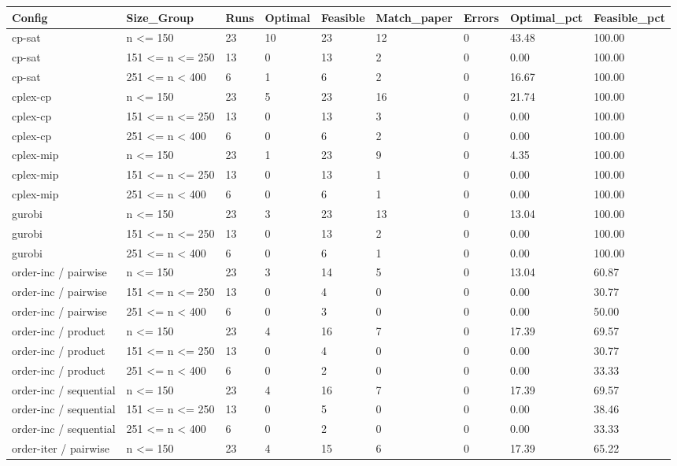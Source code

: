 \begin{tabular}{lllllllll}
\hline
Config & Size\_Group & Runs & Optimal & Feasible & Match\_paper & Errors & Optimal\_pct & Feasible\_pct \\
\hline
cp-sat & n <= 150 & 23 & 10 & 23 & 12 & 0 & 43.48 & 100.00 \\
cp-sat & 151 <= n <= 250 & 13 & 0 & 13 & 2 & 0 & 0.00 & 100.00 \\
cp-sat & 251 <= n < 400 & 6 & 1 & 6 & 2 & 0 & 16.67 & 100.00 \\
cplex-cp & n <= 150 & 23 & 5 & 23 & 16 & 0 & 21.74 & 100.00 \\
cplex-cp & 151 <= n <= 250 & 13 & 0 & 13 & 3 & 0 & 0.00 & 100.00 \\
cplex-cp & 251 <= n < 400 & 6 & 0 & 6 & 2 & 0 & 0.00 & 100.00 \\
cplex-mip & n <= 150 & 23 & 1 & 23 & 9 & 0 & 4.35 & 100.00 \\
cplex-mip & 151 <= n <= 250 & 13 & 0 & 13 & 1 & 0 & 0.00 & 100.00 \\
cplex-mip & 251 <= n < 400 & 6 & 0 & 6 & 1 & 0 & 0.00 & 100.00 \\
gurobi & n <= 150 & 23 & 3 & 23 & 13 & 0 & 13.04 & 100.00 \\
gurobi & 151 <= n <= 250 & 13 & 0 & 13 & 2 & 0 & 0.00 & 100.00 \\
gurobi & 251 <= n < 400 & 6 & 0 & 6 & 1 & 0 & 0.00 & 100.00 \\
order-inc / pairwise & n <= 150 & 23 & 3 & 14 & 5 & 0 & 13.04 & 60.87 \\
order-inc / pairwise & 151 <= n <= 250 & 13 & 0 & 4 & 0 & 0 & 0.00 & 30.77 \\
order-inc / pairwise & 251 <= n < 400 & 6 & 0 & 3 & 0 & 0 & 0.00 & 50.00 \\
order-inc / product & n <= 150 & 23 & 4 & 16 & 7 & 0 & 17.39 & 69.57 \\
order-inc / product & 151 <= n <= 250 & 13 & 0 & 4 & 0 & 0 & 0.00 & 30.77 \\
order-inc / product & 251 <= n < 400 & 6 & 0 & 2 & 0 & 0 & 0.00 & 33.33 \\
order-inc / sequential & n <= 150 & 23 & 4 & 16 & 7 & 0 & 17.39 & 69.57 \\
order-inc / sequential & 151 <= n <= 250 & 13 & 0 & 5 & 0 & 0 & 0.00 & 38.46 \\
order-inc / sequential & 251 <= n < 400 & 6 & 0 & 2 & 0 & 0 & 0.00 & 33.33 \\
order-iter / pairwise & n <= 150 & 23 & 4 & 15 & 6 & 0 & 17.39 & 65.22 \\

\end{tabular}
